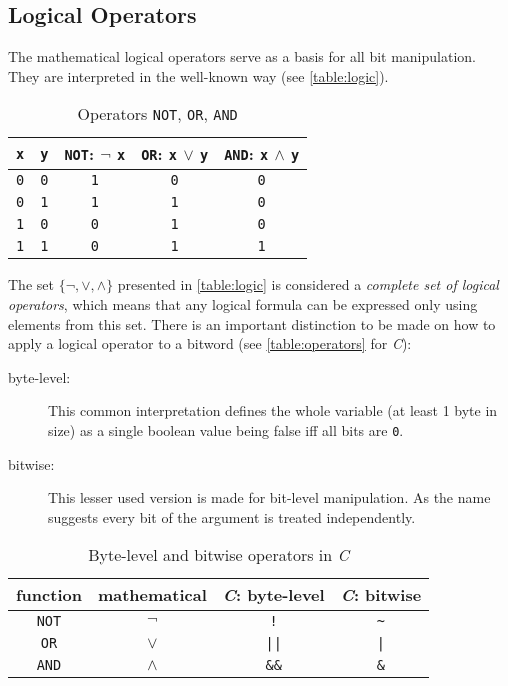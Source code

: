 \subsection*{Logical Operators}
The mathematical logical operators serve as a basis
for all bit manipulation.
They are interpreted in the well-known way (see \autoref{table:logic}).

\begin{table}[H]
\centering
\begin{tabular}{c|c||c|c|c}
  \lstinline$x$ & \lstinline$y$
& \lstinline$NOT$: $\lnot$ \lstinline$x$
& \lstinline$OR$: \lstinline$x$ $\lor$ \lstinline$y$
& \lstinline$AND$: \lstinline$x$ $\land$ \lstinline$y$\\
\hline\hline
  \lstinline$0$ & \lstinline$0$
& \lstinline$1$ & \lstinline$0$ & \lstinline$0$\\
\hline
  \lstinline$0$ & \lstinline$1$
& \lstinline$1$ & \lstinline$1$ & \lstinline$0$\\
\hline
  \lstinline$1$ & \lstinline$0$
& \lstinline$0$ & \lstinline$1$ & \lstinline$0$\\
\hline
  \lstinline$1$ & \lstinline$1$
& \lstinline$0$ & \lstinline$1$ & \lstinline$1$\\
\end{tabular}
\caption{Operators \lstinline$NOT$, \lstinline$OR$, \lstinline$AND$}
\label{table:logic}
\end{table}

The set $\{\lnot, \lor, \land\}$ presented in \autoref{table:logic}
is considered a \emph{complete set of logical operators},
which means that any logical formula can be expressed
only using elements from this set.
There is an important distinction to be made
on how to apply a logical operator to a bitword
(see \autoref{table:operators} for \emph{C}):

\begin{description}
\item[byte-level:] This common interpretation
defines the whole variable (at least 1 byte in size)
as a single boolean value being false iff all bits are \lstinline$0$.

\item[bitwise:] This lesser used version
is made for bit-level manipulation.
As the name suggests every bit of the argument is treated independently.

\end{description}

\begin{table}[H]
\centering
\begin{tabular}{c|c|c|c}
function & mathematical & \emph{C}: byte-level & \emph{C}: bitwise\\
\hline
\lstinline$NOT$ & $\lnot$ & \lstinline$!$ & \lstinline$~$\\
\lstinline$OR$ & $\lor$ & \lstinline$||$ & \lstinline$|$\\
\lstinline$AND$ & $\land$ & \lstinline$&&$ & \lstinline$&$\\
\end{tabular}
\caption{Byte-level and bitwise operators in \emph{C}}
\label{table:operators}
\end{table}


